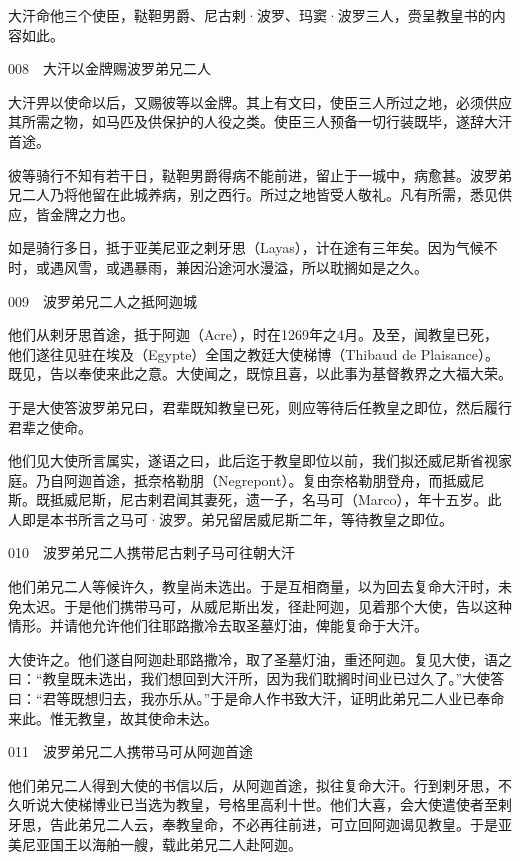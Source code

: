 \documentclass[12pt,UTF8]{ctexbook}
\begin{document}
大汗命他三个使臣，鞑靼男爵、尼古剌·波罗、玛窦·波罗三人，赍呈教皇书的内容如此。





008　大汗以金牌赐波罗弟兄二人

大汗畀以使命以后，又赐彼等以金牌。其上有文曰，使臣三人所过之地，必须供应其所需之物，如马匹及供保护的人役之类。使臣三人预备一切行装既毕，遂辞大汗首途。

彼等骑行不知有若干日，鞑靼男爵得病不能前进，留止于一城中，病愈甚。波罗弟兄二人乃将他留在此城养病，别之西行。所过之地皆受人敬礼。凡有所需，悉见供应，皆金牌之力也。

如是骑行多日，抵于亚美尼亚之剌牙思（Layas），计在途有三年矣。因为气候不时，或遇风雪，或遇暴雨，兼因沿途河水漫溢，所以耽搁如是之久。





009　波罗弟兄二人之抵阿迦城

他们从剌牙思首途，抵于阿迦（Acre），时在1269年之4月。及至，闻教皇已死，他们遂往见驻在埃及（Egypte）全国之教廷大使梯博（Thibaud de Plaisance）。既见，告以奉使来此之意。大使闻之，既惊且喜，以此事为基督教界之大福大荣。

于是大使答波罗弟兄曰，君辈既知教皇已死，则应等待后任教皇之即位，然后履行君辈之使命。

他们见大使所言属实，遂语之曰，此后迄于教皇即位以前，我们拟还威尼斯省视家庭。乃自阿迦首途，抵奈格勒朋（Negrepont）。复由奈格勒朋登舟，而抵威尼斯。既抵威尼斯，尼古剌君闻其妻死，遗一子，名马可（Marco），年十五岁。此人即是本书所言之马可·波罗。弟兄留居威尼斯二年，等待教皇之即位。





010　波罗弟兄二人携带尼古剌子马可往朝大汗

他们弟兄二人等候许久，教皇尚未选出。于是互相商量，以为回去复命大汗时，未免太迟。于是他们携带马可，从威尼斯出发，径赴阿迦，见着那个大使，告以这种情形。并请他允许他们往耶路撒冷去取圣墓灯油，俾能复命于大汗。

大使许之。他们遂自阿迦赴耶路撒冷，取了圣墓灯油，重还阿迦。复见大使，语之曰：“教皇既未选出，我们想回到大汗所，因为我们耽搁时间业已过久了。”大使答曰：“君等既想归去，我亦乐从。”于是命人作书致大汗，证明此弟兄二人业已奉命来此。惟无教皇，故其使命未达。





011　波罗弟兄二人携带马可从阿迦首途

他们弟兄二人得到大使的书信以后，从阿迦首途，拟往复命大汗。行到剌牙思，不久听说大使梯博业已当选为教皇，号格里高利十世。他们大喜，会大使遣使者至剌牙思，告此弟兄二人云，奉教皇命，不必再往前进，可立回阿迦谒见教皇。于是亚美尼亚国王以海舶一艘，载此弟兄二人赴阿迦。
\end{document}
